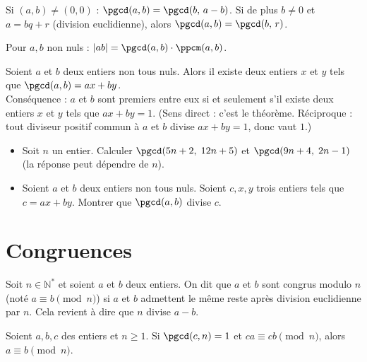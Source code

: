 \begin{fact}
	Si $(a,b)\neq(0,0)$ : $\pgcd(a, b) = \pgcd(b,\, a - b)$. Si de plus $b \neq 0$ et $a = bq + r$ (division euclidienne), alors $\pgcd(a, b) = \pgcd(b,\, r)$.
\end{fact}

\begin{fact}
	Pour $a, b$ non nuls : $|ab| = \pgcd(a, b) \cdot \ppcm(a, b)$.
\end{fact}

\begin{fact}
	Soient $a$ et $b$ deux entiers non tous nuls. Alors il existe deux entiers $x$ et $y$ tels que $\pgcd(a, b) = ax + by$.\\
	\quad Conséquence : $a$ et $b$ sont premiers entre eux si et seulement s'il existe deux entiers $x$ et $y$ tels que $ax + by = 1$. (Sens direct : c'est le théorème. Réciproque : tout diviseur positif commun à $a$ et $b$ divise $ax + by = 1$, donc vaut $1$.)
\end{fact}

\begin{exercise}
	\begin{itemize}
		\item[$\bullet$] Soit $n$ un entier. Calculer $\pgcd(5n + 2,\; 12n + 5)$ et $\pgcd(9n + 4,\; 2n - 1)$ (la réponse peut dépendre de $n$).
	\item[$\bullet$]Soient $a$ et $b$ deux entiers non tous nuls. Soient $c, x, y$ trois entiers tels que $c = ax + by.$ Montrer que $\pgcd(a, b)$ divise $c.$
\end{itemize}
\end{exercise}

\section{Congruences}

\begin{defi}
	Soit $n \in \mathbb{N}^*$ et soient $a$ et $b$ deux entiers. On dit que $a$ et $b$ sont congrus modulo $n$ (noté $a \equiv b \pmod{n}$) si $a$ et $b$ admettent le même reste après division euclidienne par $n$. Cela revient à dire que $n$ divise $a - b$.
\end{defi}

\begin{fact} Soient $a, b, c$ des entiers et $n \geq 1$. Si $\pgcd(c, n) = 1$ et $ca \equiv cb \pmod{n}$, alors $a \equiv b \pmod{n}$.
\end{fact}

